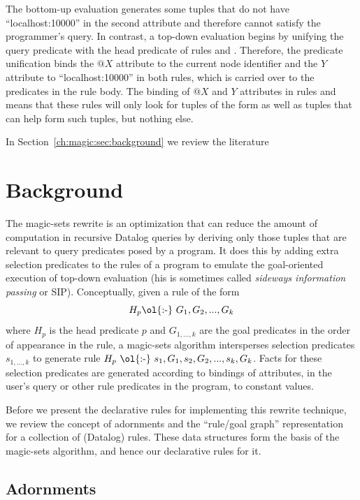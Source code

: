 The bottom-up evaluation generates some  tuples that do not have
``localhost:10000'' in the second attribute and therefore cannot satisfy the
programmer's query.  In contrast, a top-down evaluation begins by unifying the
query predicate with the head predicate of rules  and .
Therefore, the  predicate unification binds the $@X$ attribute to the
current node identifier and the $Y$ attribute to ``localhost:10000'' in both
rules, which is carried over to the predicates in the rule body.  The binding
of $@X$ and $Y$ attributes in rules  and  means that these rules
will only look for tuples of the form
 as well as tuples that can help
form such  tuples, but nothing else.

In Section~\ref{ch:magic:sec:background} we review the literature

\section{Background}

The magic-sets rewrite is an optimization that can reduce the amount of
computation in recursive Datalog queries by deriving only those tuples that are
relevant to query predicates posed by a program.  It does this by adding extra
selection predicates to the rules of a program to emulate the goal-oriented
execution of top-down evaluation (his is sometimes called \emph{sideways
information passing} or SIP).  Conceptually, given a rule of the form \[ H_p
\text{\ol{:-}}\ G_1, G_2, ..., G_k \] where $H_p$ is the head predicate $p$ and
$G_{1,...,k}$ are the goal predicates in the order of appearance in the rule, a
magic-sets algorithm intersperses selection predicates $s_{1,...,k}$ to
generate rule $H_p \ \text{\ol{:-}}\ s_1, G_1, s_2, G_2, ..., s_{k}, G_k$.
Facts for these selection predicates are generated according to bindings of
attributes, in the user's query or other rule predicates in the program, to
constant values.

Before we present the declarative rules for implementing this rewrite
technique, we review the concept of adornments and the ``rule/goal graph''
representation for a collection of \OVERLOG (Datalog) rules.  These data
structures form the basis of the magic-sets algorithm, and hence our
declarative rules for it.


\subsection{Adornments}

